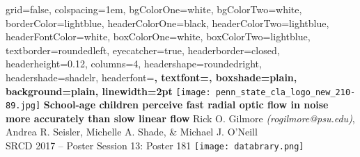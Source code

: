 \documentclass[landscape,final,paperwidth=60in,paperheight=39in,fontscale=0.285]{baposter}
\begin{document}



\begin{poster}%
  {
  grid=false,
  colspacing=1em,
  bgColorOne=white,
  bgColorTwo=white,
  borderColor=lightblue,
  headerColorOne=black,
  headerColorTwo=lightblue,
  headerFontColor=white,
  boxColorOne=white,
  boxColorTwo=lightblue,
  textborder=roundedleft,
  eyecatcher=true,
  headerborder=closed,
  headerheight=0.12\textheight,
  columns=4, %
  headershape=roundedright,
  headershade=shadelr,
  headerfont=\Large\bf\textsc, %
  textfont={\setlength{\parindent}{1.5em}},
  boxshade=plain,
  background=plain,
  linewidth=2pt
  }
  {\texttt{[image: penn\_state\_cla\_logo\_new\_210-89.jpg]}}
  {\bf{School-age children perceive fast radial optic flow in noise\\more accurately than slow linear flow} 
  \vspace{0.3em}}
  {Rick O. Gilmore \emph{(rogilmore@psu.edu)}, Andrea R. Seisler, Michelle A. Shade, \& Michael J. O'Neill\\ \vspace{0.3em}
  SRCD 2017 -- Poster Session 13: Poster 181}
 {\texttt{[image: databrary.png]}}


\end{poster}
\end{document}
